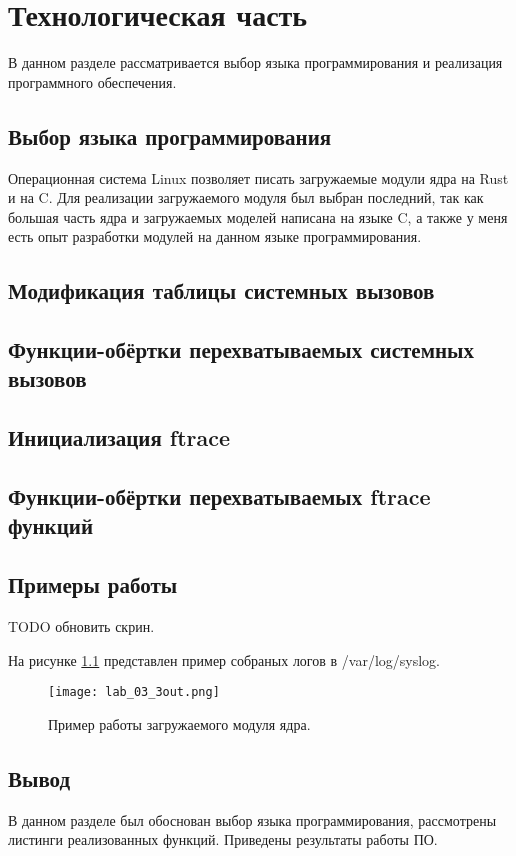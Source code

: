 \chapter{Технологическая часть}
    В данном разделе рассматривается выбор языка программирования 
    и реализация программного обеспечения.

\section{Выбор языка программирования}
    Операционная система Linux позволяет писать загружаемые модули ядра на Rust и на C.
    Для реализации загружаемого модуля был выбран последний, так как
    большая часть ядра и загружаемых моделей написана на языке C, 
    а также у меня есть опыт разработки модулей на данном языке программирования.

\section{Модификация таблицы системных вызовов}

\section{Функции-обёртки перехватываемых системных вызовов}

\section{Инициализация ftrace}

\section{Функции-обёртки перехватываемых ftrace функций}

\section{Примеры работы}

    TODO обновить скрин.
    
    На рисунке \ref{3out} представлен пример собраных логов в /var/log/syslog.
    \begin{figure}[h!]
        \centering
        \texttt{[image: lab\_03\_3out.png]}
        \caption{Пример работы загружаемого модуля ядра.}
        \label{3out}
    \end{figure}

\section{Вывод}
    В данном разделе был обоснован выбор языка программирования, 
    рассмотрены листинги реализованных функций. 
    Приведены результаты работы ПО.

\pagebreak
